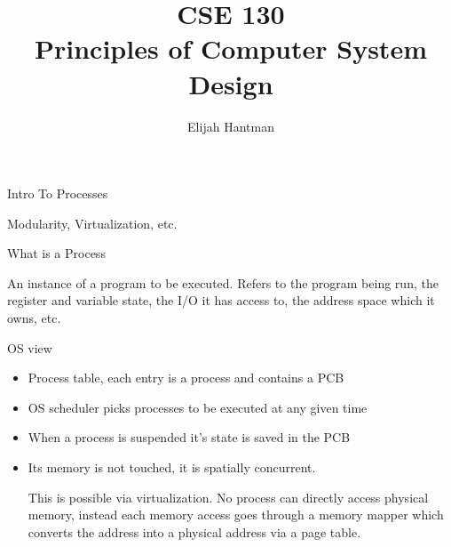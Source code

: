 \documentclass{report}
\title{\Huge{CSE 130}\\\huge{Principles of Computer System Design}}
\author{\huge{Elijah Hantman}}
\date{}
\begin{document}
\maketitle
\newpage

\large{Intro To Processes}
\begin{description}
    \item Modularity, Virtualization, etc.
    \item What is a Process
        \begin{mdframed}
            An instance of a program to be executed.
            Refers to the program being run, the register and variable
            state, the I/O it has access to, the address space
            which it owns, etc.
        \end{mdframed}
    \item OS view
        \begin{itemize}
            \item Process table, each entry is a process and contains a PCB
            \item OS scheduler picks processes to be executed at any given time
            \item When a process is suspended it's state is saved in the PCB
            \item Its memory is not touched, it is spatially concurrent.
                \begin{mdframed}
                    This is possible via virtualization. No process can directly
                    access physical memory, instead each memory access goes through
                    a memory mapper which converts the address into a physical address
                    via a page table.


\end{mdframed}
\end{itemize}
\end{description}
\end{document}
